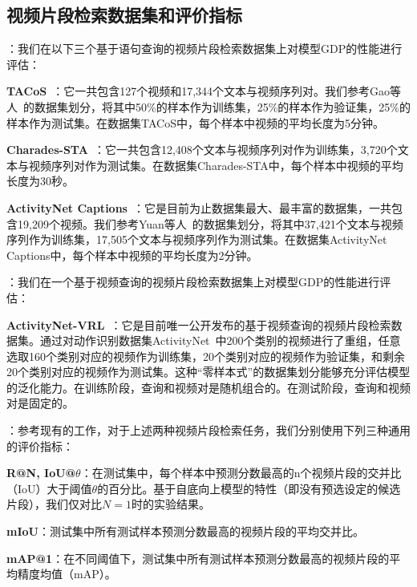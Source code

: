 \subsection{视频片段检索数据集和评价指标}

\textbf{}：我们在以下三个基于语句查询的视频片段检索数据集上对模型GDP的性能进行评估：

\textbf{TACoS}~\cite{regneri2013grounding}：它一共包含127个视频和17,344个文本与视频序列对。我们参考Gao等人~\cite{gao2017tall}的数据集划分，将其中50\%的样本作为训练集，25\%的样本作为验证集，25\%的样本作为测试集。在数据集TACoS中，每个样本中视频的平均长度为5分钟。

\textbf{Charades-STA}~\cite{gao2017tall}：它一共包含12,408个文本与视频序列对作为训练集，3,720个文本与视频序列对作为测试集。在数据集Charades-STA中，每个样本中视频的平均长度为30秒。

\textbf{ActivityNet Captions}~\cite{krishna2017dense}：它是目前为止数据集最大、最丰富的数据集，一共包含19,209个视频。我们参考Yuan等人~\cite{yuan2019find}的数据集划分，将其中37,421个文本与视频序列作为训练集，17,505个文本与视频序列作为测试集。在数据集ActivityNet Captions中，每个样本中视频的平均长度为2分钟。


\textbf{}：我们在一个基于视频查询的视频片段检索数据集上对模型GDP的性能进行评估：

\textbf{ActivityNet-VRL}~\cite{feng2018video}：它是目前唯一公开发布的基于视频查询的视频片段检索数据集。通过对动作识别数据集ActivityNet~\cite{caba2015activitynet}中200个类别的视频进行了重组，任意选取160个类别对应的视频作为训练集，20个类别对应的视频作为验证集，和剩余20个类别对应的视频作为测试集。这种“零样本式”的数据集划分能够充分评估模型的泛化能力。在训练阶段，查询和视频对是随机组合的。在测试阶段，查询和视频对是固定的。


\textbf{}：参考现有的工作，对于上述两种视频片段检索任务，我们分别使用下列三种通用的评价指标：

\textbf{R@N, IoU@$\theta$}：在测试集中，每个样本中预测分数最高的n个视频片段的交并比（IoU）大于阈值$\theta$的百分比。基于自底向上模型的特性（即没有预选设定的候选片段），我们仅对比$N=1$时的实验结果。

\textbf{mIoU}：测试集中所有测试样本预测分数最高的视频片段的平均交并比。

\textbf{mAP@1}：在不同阈值下，测试集中所有测试样本预测分数最高的视频片段的平均精度均值（mAP）。


